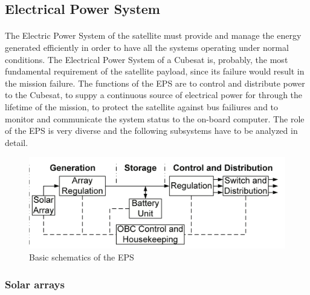 \subsection{Electrical Power System}

\paragraph{}The Electric Power System of the satellite must provide and manage the energy generated efficiently in order to have all the systems operating under normal conditions. The Electrical Power System of a Cubesat is, probably, the most fundamental requirement of the satellite payload, since its failure would result in the mission failure. The functions of the EPS are to control and distribute power to the Cubesat, to suppy a continuous source of electrical power for through the lifetime of the mission, to protect the satellite against bus failiures and to monitor and communicate the system status to the on-board computer. The role of the EPS is very diverse and the following subsystems have to be analyzed in detail.

\begin{figure}[h]
\includegraphics[scale=0.6]{./sections/SatelliteDesign/images/EPSschematics}
\centering
\caption{Basic schematics of the EPS \cite{epsbasics}}
\end{figure}

\subsubsection{Solar arrays}

